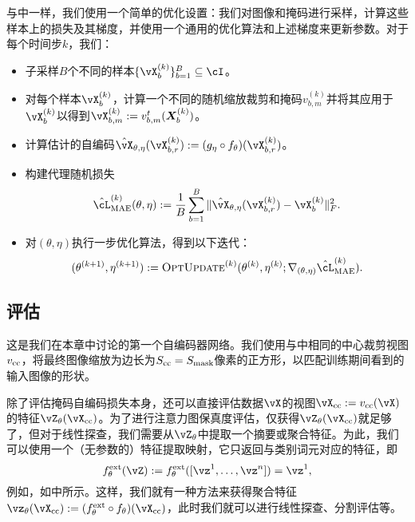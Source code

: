 \documentclass[../../book-main.tex]{subfiles}
\begin{document}
与中一样，我们使用一个简单的优化设置：我们对图像和掩码进行采样，计算这些样本上的损失及其梯度，并使用一个通用的优化算法和上述梯度来更新参数。对于每个时间步\(k\)，我们：
\begin{itemize}
    \item 子采样\(B\)个不同的样本\(\{\vX_{b}^{(k)}\}_{b = 1}^{B} \subseteq \cI\)。
    \item 对每个样本\(\vX_{b}^{(k)}\)，计算一个不同的随机缩放裁剪和掩码\(v_{b, m}^{(k)}\)并将其应用于\(\vX_{b}^{(k)}\)以得到\(\vX_{b, m}^{(k)} := v_{b, m}^{t}(\X_{b}^{(k)})\)。
    \item 计算估计的自编码\(\hat{\vX}_{\theta, \eta}(\vX_{b, r}^{(k)}) := (g_{\eta} \circ f_{\theta})(\vX_{b, r}^{(k)})\)。
    \item 构建代理随机损失
    \begin{equation}
        \hat{\cL}_{\mathrm{MAE}}^{(k)}(\theta, \eta) := \frac{1}{B}\sum_{b = 1}^{B}\norm{\hat{\vX}_{\theta, \eta}(\vX_{b, r}^{(k)}) - \vX_{b}^{(k)}}_{F}^{2}.
    \end{equation}
    \item 对\((\theta, \eta)\)执行一步优化算法，得到以下迭代：
    \begin{equation}
        (\theta^{(k + 1)}, \eta^{(k + 1)}) := \textsc{OptUpdate}^{(k)}(\theta^{(k)}, \eta^{(k)}; \nabla_{(\theta, \eta)}\hat{\cL}_{\mathrm{MAE}}^{(k)}).
    \end{equation}
\end{itemize}

\subsection{评估} \label{sub:image_completion_optimization_1}

这是我们在本章中讨论的第一个自编码器网络。我们使用与中相同的中心裁剪视图\(v_{\mathrm{cc}}\)，将最终图像缩放为边长为\(S_{\mathrm{cc}} = S_{\mathrm{mask}}\)像素的正方形，以匹配训练期间看到的输入图像的形状。

除了评估掩码自编码损失本身，还可以直接评估数据\(\vX\)的视图\(\vX_{\cc} := v_{\cc}(\vX)\)的特征\(\vZ_{\theta}(\vX_{\cc})\)。为了进行注意力图保真度评估，仅获得\(\vZ_{\theta}(\vX_{\cc})\)就足够了，但对于线性探查，我们需要从\(\vZ_{\theta}\)中提取一个摘要或聚合特征。为此，我们可以使用一个（无参数的）特征提取映射，它只返回与类别词元对应的特征，即
\begin{equation}
    f_{\theta}^{\ext}(\vZ) := f_{\theta}^{\ext}([\vz^{1}, \dots, \vz^{n}]) = \vz^{1},
\end{equation}
例如，如中所示。这样，我们就有一种方法来获得聚合特征\(\vz_{\theta}(\vX_{\cc}) := (f_{\theta}^{\ext} \circ f_{\theta})(\vX_{\cc})\)，此时我们就可以进行线性探查、分割评估等。
\end{document}
